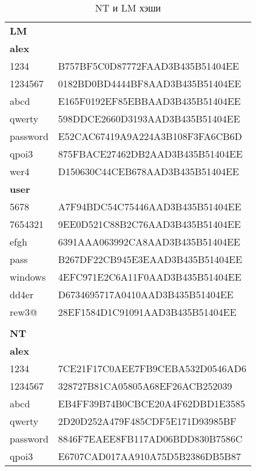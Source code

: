 \begin{table}[]
    \centering
    \caption{NT и LM хэши}
    \begin{tabular}{ll}
    \textbf{LM}   & \textbf{}                        \\
    \textbf{alex} &                                  \\
    1234          & B757BF5C0D87772FAAD3B435B51404EE \\
    1234567       & 0182BD0BD4444BF8AAD3B435B51404EE \\
    abcd          & E165F0192EF85EBBAAD3B435B51404EE \\
    qwerty        & 598DDCE2660D3193AAD3B435B51404EE \\
    password      & E52CAC67419A9A224A3B108F3FA6CB6D \\
    qpoi3         & 875FBACE27462DB2AAD3B435B51404EE \\
    wer4          & D150630C44CEB678AAD3B435B51404EE \\
    \textbf{user} &                                  \\
    5678          & A7F94BDC54C75446AAD3B435B51404EE \\
    7654321       & 9EE0D521C88B2C76AAD3B435B51404EE \\
    efgh          & 6391AAA063992CA8AAD3B435B51404EE \\
    pass          & B267DF22CB945E3EAAD3B435B51404EE \\
    windows       & 4EFC971E2C6A11F0AAD3B435B51404EE \\
    dd4er         & D6734695717A0410AAD3B435B51404EE \\
    rew3@         & 28EF1584D1C91091AAD3B435B51404EE \\
                  &                                  \\
    \textbf{NT}   &                                  \\
    \textbf{alex} & \textbf{}                        \\
    1234          & 7CE21F17C0AEE7FB9CEBA532D0546AD6 \\
    1234567       & 328727B81CA05805A68EF26ACB252039 \\
    abcd          & EB4FF39B74B0CBCE20A4F62DBD1E3585 \\
    qwerty        & 2D20D252A479F485CDF5E171D93985BF \\
    password      & 8846F7EAEE8FB117AD06BDD830B7586C \\
    qpoi3         & E6707CAD017AA910A75D5B2386DB5B87 \\

\end{tabular}
\end{table}
